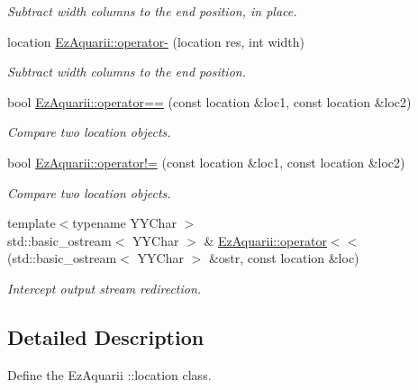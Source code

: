 \begin{DoxyCompactItemize}
\begin{DoxyCompactList}\small\item\em Subtract {\itshape width} columns to the end position, in place. \end{DoxyCompactList}\item 
location \hyperlink{location_8hh_a6d9bc86078c1c54ebed3bea8787e1e36}{Ez\+Aquarii\+::operator-\/} (location res, int width)\hypertarget{location_8hh_a6d9bc86078c1c54ebed3bea8787e1e36}{}\label{location_8hh_a6d9bc86078c1c54ebed3bea8787e1e36}

\begin{DoxyCompactList}\small\item\em Subtract {\itshape width} columns to the end position. \end{DoxyCompactList}\item 
bool \hyperlink{location_8hh_af1b4a18fcc5aee2e7ba3903b6e3e4273}{Ez\+Aquarii\+::operator==} (const location \&loc1, const location \&loc2)\hypertarget{location_8hh_af1b4a18fcc5aee2e7ba3903b6e3e4273}{}\label{location_8hh_af1b4a18fcc5aee2e7ba3903b6e3e4273}

\begin{DoxyCompactList}\small\item\em Compare two location objects. \end{DoxyCompactList}\item 
bool \hyperlink{location_8hh_ad047631bf5de9f0f66334abc87e9301e}{Ez\+Aquarii\+::operator!=} (const location \&loc1, const location \&loc2)\hypertarget{location_8hh_ad047631bf5de9f0f66334abc87e9301e}{}\label{location_8hh_ad047631bf5de9f0f66334abc87e9301e}

\begin{DoxyCompactList}\small\item\em Compare two location objects. \end{DoxyCompactList}\item 
{\footnotesize template$<$typename Y\+Y\+Char $>$ }\\std\+::basic\+\_\+ostream$<$ Y\+Y\+Char $>$ \& \hyperlink{location_8hh_a6e36af7e351152159a60440b02147392}{Ez\+Aquarii\+::operator$<$$<$} (std\+::basic\+\_\+ostream$<$ Y\+Y\+Char $>$ \&ostr, const location \&loc)
\begin{DoxyCompactList}\small\item\em Intercept output stream redirection. \end{DoxyCompactList}\end{DoxyCompactItemize}


\subsection{Detailed Description}
Define the Ez\+Aquarii \+::location class. 

